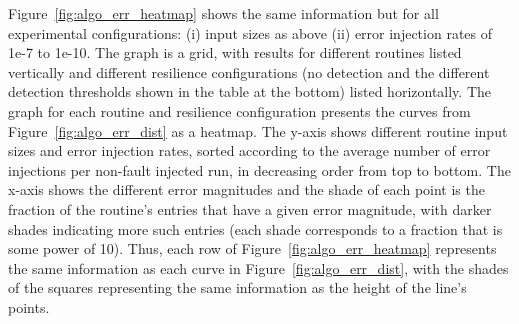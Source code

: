 \documentclass[10pt, conference, compsocconf]{IEEEtran}
\begin{document}
Figure~\ref{fig:algo_err_heatmap} shows the same information but for all experimental configurations: (i) input sizes as above (ii) error injection rates of 1e-7 to 1e-10.
The graph is a grid, with results for different routines listed vertically and different resilience configurations (no detection and the different detection thresholds shown in the table at the bottom) listed horizontally.
The graph for each routine and resilience configuration presents the curves from Figure~\ref{fig:algo_err_dist} as a heatmap.
The y-axis shows different routine input sizes and error injection rates, sorted according to the average number of error injections per non-fault injected run, in decreasing order from top to bottom.
The x-axis shows the different error magnitudes and the shade of each point is the fraction of the routine's entries that have a given error magnitude, with darker shades indicating more such entries (each shade corresponds to a fraction that is some power of 10).
Thus, each row of Figure~\ref{fig:algo_err_heatmap} represents the same information as each curve in Figure~\ref{fig:algo_err_dist}, with the shades of the squares representing the same information as the height of the line's points.

\end{document}
